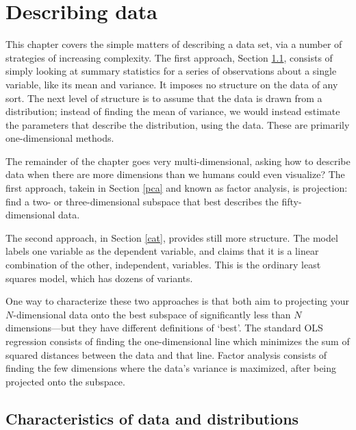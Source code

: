 \chapter[Projections]{Describing data} \label{projections}
\def\xv{{\bf x} } \def\yv{{\bf y} } \def\pv{{\bf p} }
\def\Iv{{\bf I}}\def\Sv{{\bf S}}\def\yv{{\bf y}}\def\Zv{{\bf Z}} \def\cv{{\bf c}} \def\uv{{\bf u}} \def\Yv{{\bf Y}} \def\Xv{{\bf X}} \def\Qv{{\bf Q}}
\def\betav{{\mbox{\boldmath$\beta$}}}
\def\vector#1{\left[\matrix{#1}\right]}

This chapter covers the simple matters of describing a data set, via a
number of strategies of increasing complexity. 
The first approach, Section \ref{basicstats}, consists of simply looking
at summary statistics for a series of observations about a single
variable, like its mean and variance. It imposes no structure on the
data of any sort. The next level of structure is to
assume that the data is drawn from a distribution; instead of finding
the mean of variance, we would instead estimate the parameters that
describe the distribution, using the data. These are primarily
one-dimensional methods.

The remainder of the chapter goes very multi-dimensional, asking how
to describe data when there are more dimensions than we humans could
even visualize?  The first approach, takein in Section \ref{pca} and
known as factor analysis,
is projection: find a two- or three-dimensional subspace that best
describes the fifty-dimensional data. 

The second approach, in Section \ref{cat}, provides still more
structure. The model labels one variable as the dependent variable, and claims
that it is a linear combination of the other, independent, variables.
This is the ordinary least squares model, which has dozens of variants.

One way to characterize these two approaches is that both aim to projecting your
$N$-dimensional data onto the best subspace of significantly less than
$N$ dimensions---but they have different definitions of `best'.
The standard OLS regression consists of
finding the one-dimensional line which minimizes the sum of squared
distances between the data and that line. Factor analysis consists
of finding the few dimensions where the data's variance is maximized, after being
projected onto the subspace.



\section{Characteristics of data and distributions}\label{basicstats}


